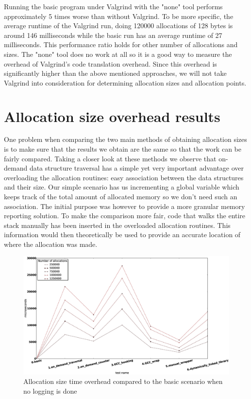 Running the basic program under Valgrind with the "none" tool performs approximately 5 times worse than without Valgrind. To be more specific, the average runtime of the Valgrind run, doing 120000 allocations of 128 bytes is around 146 milliseconds while the basic run has an average runtime of 27 milliseconds. This performance ratio holds for other number of allocations and sizes. The "none" tool does no work at all so it is a good way to measure the overhead of Valgrind's code translation overhead. Since this overhead is significantly higher than the above mentioned approaches, we will not take Valgrind into consideration for determining allocation sizes and allocation points.

\section{Allocation size overhead results}
\label{section:allocsz}

One problem when comparing the two main methods of obtaining allocation sizes is to make sure that the results we obtain are the same so that the work can be fairly compared. Taking a closer look at these methods we observe that on-demand data structure traversal has a simple yet very important advantage over overloading the allocation routines: easy association between the data structures and their size. Our simple scenario has us incrementing a global variable which keeps track of the total amount of allocated memory so we don't need such an association. The initial purpose was however to provide a more granular memory reporting solution. To make the comparison more fair, code that walks the entire stack manually has been inserted in the overloaded allocation routines. This information would then theoretically be used to provide an accurate location of where the allocation was made.

\begin{figure}[htb]
\centering
\includegraphics[width=1.0\textwidth]{src/img/allocationsizewithoutlogging}
\caption{Allocation size time overhead compared to the basic scenario when no logging is done}
\label{fig:allocszwithoutlog}
\end{figure}

